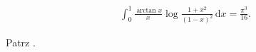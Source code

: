 %

\begin{problem_with_solution}
    \label{valean_1_26}%
    \begin{align}
        \int_0^1 \frac{\arctan x}{x} \log \frac{1+x^2}{(1-x)^2} \,\mathrm{d}x = \frac{\pi^3}{16}.
    \end{align} 
\end{problem_with_solution}


\begin{solution}
    Patrz \cite[s. 17]{valean19}.
\end{solution}

%